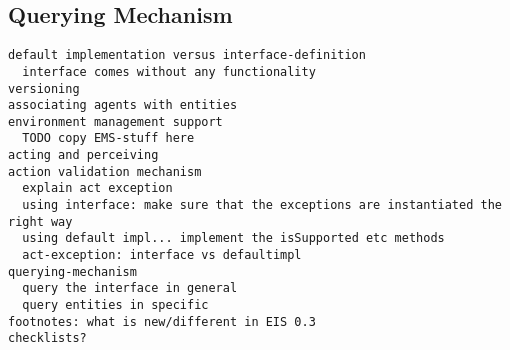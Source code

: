 \documentclass[a4]{article}
\begin{document}
	
\subsection{Querying Mechanism}

\begin{verbatim}
default implementation versus interface-definition
  interface comes without any functionality
versioning
associating agents with entities
environment management support
  TODO copy EMS-stuff here
acting and perceiving
action validation mechanism
  explain act exception
  using interface: make sure that the exceptions are instantiated the right way
  using default impl... implement the isSupported etc methods
  act-exception: interface vs defaultimpl
querying-mechanism
  query the interface in general
  query entities in specific
footnotes: what is new/different in EIS 0.3
checklists?
\end{verbatim}
\end{document}
